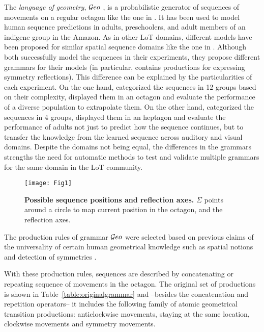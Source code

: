 The \textit{language of geometry}, $\mathcal Geo$ \cite{marie2016}, is a probabilistic generator of sequences of movements on a regular octagon like the one in . It has been used to model human sequence predictions in adults, preschoolers, and adult members of an indigene group in the Amazon. As in other LoT domains, different models have been proposed for similar spatial sequence domains like the one in \cite{yildirim2015learning}. Although both successfully model the sequences in their experiments, they propose different grammars for their models (in particular, \cite{marie2016} contains productions for expressing symmetry reflections). This difference can be explained by the particularities of each experiment. On the one hand, \cite{marie2016} categorized the sequences in 12 groups based on their complexity, displayed them in an octagon and evaluate the performance of a diverse population to extrapolate them. On the other hand, \cite{yildirim2015learning} categorized the sequences in 4 groups, displayed them in an heptagon and evaluate the performance of adults not just to predict how the sequence continues, but to transfer the knowledge from the learned sequence across auditory and visual domains. Despite the domains not being equal, the differences in the grammars strengths the need for automatic methods to test and validate multiple grammars for the same domain in the LoT community.

\begin{figure}[!ht]
   \texttt{[image: Fig1]}
   \caption{{\bf Possible sequence positions and reflection axes.} $\Sigma$ points around a circle to map current position in the octagon, and the reflection axes.}\label{fig:circle}
\end{figure}


The production rules of grammar $\mathcal Geo$ were selected based on previous claims of the universality of certain human geometrical knowledge  \cite{izard2011geometry,dehaene2006core,dillon2013core} such as spatial notions \cite{landau1981spatial,lee2012navigation} and detection of symmetries \cite{westphal2012production,machilsen2009role}.

With these production rules, sequences are described by concatenating or repeating sequence of movements in the octagon. The original set of productions is shown in Table~\ref{table:originalgrammar} and --besides the concatenation and repetition operators-- it includes the following family of atomic geometrical transition productions: anticlockwise movements, staying at the same location, clockwise movements and symmetry movements.

